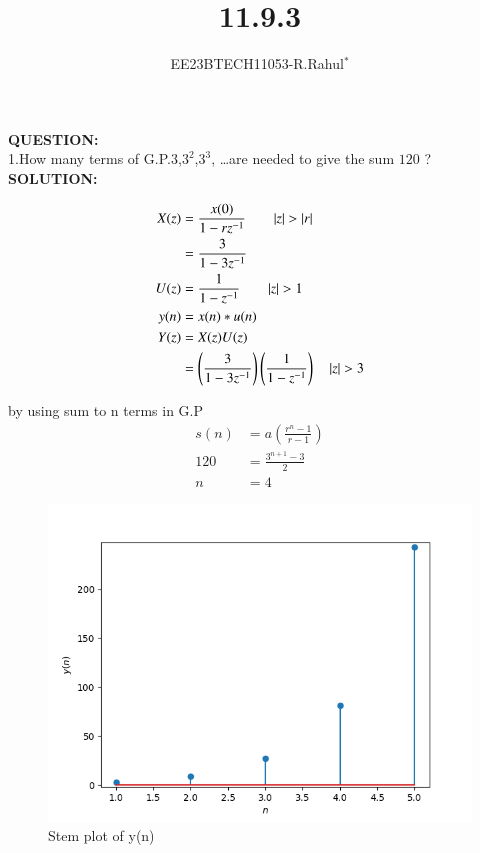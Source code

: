 \documentclass[journal,12pt,twocolumn]{IEEEtran}
\theoremstyle{remark}
\begin{document}

\vspace{3cm}
\title{\textbf{11.9.3}}
\author{EE23BTECH11053-R.Rahul$^{*}$%
}
\maketitle
\newpage
\bigskip

\textbf{QUESTION:}\\
1.How many terms of G.P.$3$,$3^2$,$3^3$, \ldots are needed to give the sum $120$ ?\\

\textbf{SOLUTION:}\\
\vspace{-0.25cm}

\begin{center}
    
\begin{align}
      X(z)&=\frac{x(0)}{1-rz^{-1}} \qquad |z|>|r|\\
      &=\frac{3}{1-3z^{-1}}\\
      U(z)&=\frac{1}{1-z^{-1}} \qquad |z|>1\\
      y(n)&= x(n)*u(n)\\
      Y(z)&=X(z)U(z)\\
&=\brak{ \frac{3}{1-3z^{-1}}}\brak{\frac{1}{1-z^{-1}}}\quad|z| > 3 \end{align}
\end{center}
by using sum to n terms in G.P
\begin{align}
    s(n)&=a(\frac{r^{n}-1}{r-1})\\
    120&=\frac{3^{n+1}-3}{2}\\
    n&=4
\end{align}
\begin{figure}[h]
  
  \includegraphics[width=\columnwidth]{figs/graph.png}
  \caption{Stem plot of y(n)}
  \label{fig:your_label}
\end{figure}
\end{document}
